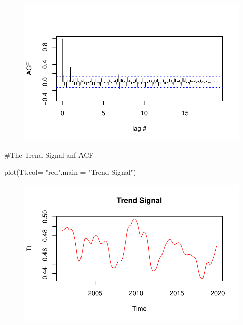 \documentclass[
  letterpaper,
  DIV=11,
  numbers=noendperiod]{scrartcl}
\newenvironment{Shaded}{\begin{snugshade}}{\end{snugshade}}
\newcommand{\AttributeTok}[1]{\textcolor[rgb]{0.40,0.45,0.13}{#1}}
\newcommand{\CommentTok}[1]{\textcolor[rgb]{0.37,0.37,0.37}{#1}}
\newcommand{\FunctionTok}[1]{\textcolor[rgb]{0.28,0.35,0.67}{#1}}
\newcommand{\NormalTok}[1]{\textcolor[rgb]{0.00,0.23,0.31}{#1}}
\newcommand{\StringTok}[1]{\textcolor[rgb]{0.13,0.47,0.30}{#1}}
\begin{document}
\begin{figure}[H]

{\centering \includegraphics{Quarto_files/figure-pdf/unnamed-chunk-17-2.pdf}

}

\end{figure}

\begin{Shaded}
\begin{Highlighting}[]
\CommentTok{\#The Trend Signal anf ACF}

\FunctionTok{plot}\NormalTok{(Tt,}\AttributeTok{col=} \StringTok{"red"}\NormalTok{,}\AttributeTok{main =} \StringTok{"Trend Signal"}\NormalTok{)}
\end{Highlighting}
\end{Shaded}

\begin{figure}[H]

{\centering \includegraphics{Quarto_files/figure-pdf/unnamed-chunk-17-3.pdf}

}

\end{figure}
\end{document}
